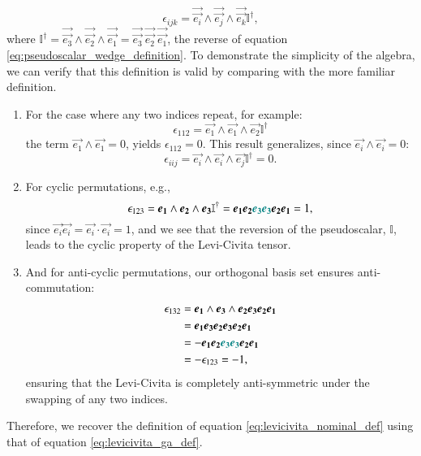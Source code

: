 \begin{equation}
    \label{eq:levicivita_ga_def}
    \epsilon_{ijk} = \vec{\vec{e_i}} \wedge \vec{\vec{e_j}} \wedge \vec{\vec{e_k}} \mathbb{I}^\dagger,
\end{equation}
where $\mathbb{I}^\dagger = \vec{\vec{e_3}} \wedge \vec{\vec{e_2}} \wedge \vec{\vec{e_1}} = \vec{\vec{e_3}} \ \vec{\vec{e_2}}  \ \vec{\vec{e_1}}  $, the reverse of equation \ref{eq:pseudoscalar_wedge_definition}. To demonstrate the simplicity of the algebra, we can verify that this definition is valid by comparing with the more familiar definition.
\begin{enumerate}
    \item For the case where any two indices repeat, for  example:
    $$ \epsilon_{112} = \vec{e_1} \wedge \vec{e_1} \wedge \vec{e_2} \mathbb{I}^\dagger $$
    the term $\vec{e_1} \wedge \vec{e_1} = 0$, yields $ \epsilon_{112} = 0 $. This result generalizes, since $ \vec{e_i} \wedge \vec{e_i} = 0$:
    $$ \epsilon_{iij} =  \vec{e_i} \wedge \vec{e_i}  \wedge \vec{e_j} \mathbb{I}^\dagger = 0.$$

    \item For cyclic permutations, e.g.,
    $$ \epsilon_{123} = \vec{e_1} \wedge \vec{e_2} \wedge \vec{e_3} \mathbb{I}^\dagger = \vec{e_1} \vec{e_2} \color{teal} \vec{e_3} \vec{e_3} \color{black}\vec{e_2} \vec{e_1} = 1, $$
    since $ \vec{e_i} \vec{e_i} = \vec{e_i} \cdot \vec{e_i} = 1$, and we see that the reversion of the pseudoscalar, $\mathbb{I}$, leads to the cyclic property of the Levi-Civita tensor.

    \item And for anti-cyclic permutations, our orthogonal basis set ensures anti-commutation:
    \begin{align*}
        \epsilon_{132} &= \vec{e_1} \wedge \vec{e_3} \wedge \vec{e_2} \vec{e_3} \vec{e_2} \vec{e_1} \\
        &= \vec{e_1} \vec{e_3} \vec{e_2} \vec{e_3} \vec{e_2} \vec{e_1} \\
        &= - \vec{e_1} \vec{e_2} \color{teal}\vec{e_3} \vec{e_3} \color{black} \vec{e_2} \vec{e_1} \\
        &= - \epsilon_{123} = -1,
    \end{align*}
    ensuring that the Levi-Civita is completely anti-symmetric under the swapping of any two indices.
    
\end{enumerate}
Therefore, we recover the definition of equation \eqref{eq:levicivita_nominal_def} using that of equation \eqref{eq:levicivita_ga_def}.

